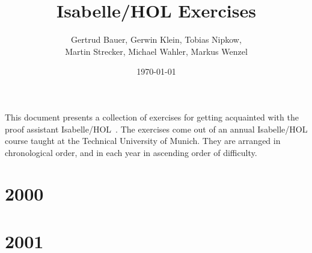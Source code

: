 
\usepackage{graphicx}
\usepackage[colorlinks,hyperindex]{hyperref}

\newcommand{\aufgabe}[3]{

}

\title{Isabelle/HOL Exercises}
\date{\today}
\author{Gertrud Bauer, Gerwin Klein, Tobias Nipkow,\\ 
  Martin Strecker, Michael Wahler, Markus Wenzel}



\maketitle

This document presents a collection of exercises for getting
acquainted with the proof assistant
Isabelle/HOL~\cite{isabelle-tutorial}.  The exercises come out of an
annual Isabelle/HOL course taught at the Technical University of
Munich. They are arranged in chronological order, and in each year in
ascending order of difficulty.

\tableofcontents


\newpage
\section{2000}
\aufgabe{2000}{a1}{Snoc}
\aufgabe{2000}{a1}{Arithmetic}
\aufgabe{2000}{a1}{Hanoi}


\newpage
\section{2001}
\aufgabe{2001}{a1}{Aufgabe1}
\aufgabe{2001}{a2}{Aufgabe2}
\aufgabe{2001}{a3}{Trie1}
\aufgabe{2001}{a3}{Trie2}
\aufgabe{2001}{a3}{Trie3}
\aufgabe{2001}{a5}{Aufgabe5}

